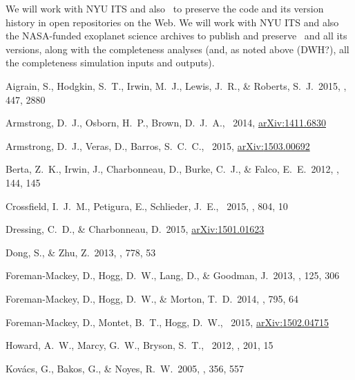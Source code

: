 \documentclass[12pt,preprint]{aastex}
\newcommand{\github}{\project{GitHub}}
\begin{document}
We will work with NYU ITS and also \github\ to preserve
the code and its version history in open repositories on the Web.
We will work with NYU ITS and also the NASA-funded exoplanet
science archives
to publish and preserve \thecatalog\ and all its versions, along with the
completeness analyses (and, as noted above (DWH?), all the
completeness simulation inputs and outputs).

\clearpage
\newcommand{\arxiv}[1]{{\href{http://arxiv.org/abs/#1}{arXiv:{#1}}}}
\begin{thebibliography}{}\raggedright%
\setlength{\itemsep}{0ex}%
\setlength{\parskip}{0ex}%
Aigrain, S., Hodgkin, S.~T., Irwin, M.~J., Lewis, J.~R., \& Roberts, S.~J.\
2015, \mnras, 447, 2880

Armstrong, D.~J., Osborn, H.~P., Brown, D.~J.~A., \etal\ 2014,
\arxiv{1411.6830}

Armstrong, D.~J., Veras, D., Barros, S.~C.~C., \etal\ 2015, \arxiv{1503.00692}

Berta, Z.~K., Irwin, J., Charbonneau, D., Burke, C.~J., \& Falco, E.~E.\ 2012,
\aj, 144, 145

Crossfield, I.~J.~M., Petigura, E., Schlieder, J.~E., \etal\ 2015, \apj, 804,
10

Dressing, C.~D., \& Charbonneau, D.\ 2015, \arxiv{1501.01623}

Dong, S., \& Zhu, Z.\ 2013, \apj, 778, 53

 Foreman-Mackey,
D., Hogg, D.~W., Lang, D., \& Goodman, J.\ 2013, \pasp, 125, 306

Foreman-Mackey, D., Hogg, D.~W., \& Morton, T.~D.\ 2014, \apj, 795, 64

Foreman-Mackey, D., Montet, B.~T., Hogg, D.~W., \etal\ 2015, \arxiv{1502.04715}

Howard, A.~W., Marcy, G.~W., Bryson, S.~T., \etal\ 2012, \apjs, 201, 15

Kov{\'a}cs, G., Bakos, G., \& Noyes, R.~W.\ 2005, \mnras, 356, 557


\end{thebibliography}
\end{document}
